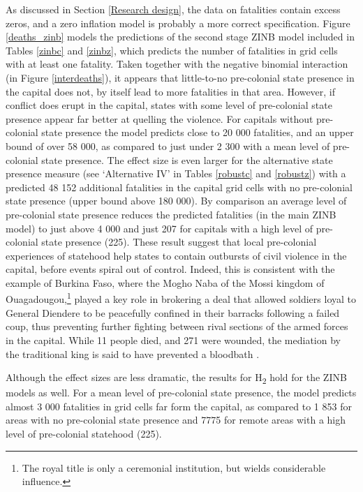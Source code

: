 \documentclass[12pt]{article}
\begin{document}
As discussed in Section \ref{Research design}, the data on fatalities contain
excess zeros, and a zero inflation model is probably a more correct
specification. Figure \ref{deaths_zinb} models the predictions of the second
stage ZINB model included in Tables \ref{zinbc} and \ref{zinbz}, which predicts
the number of fatalities in grid cells with at least one fatality. Taken
together with the negative binomial interaction (in Figure \ref{interdeaths}),
it appears that little-to-no pre-colonial state presence in the capital does
not, by itself lead to more fatalities in that area. However, if conflict does
erupt in the capital, states with some level of pre-colonial state presence
appear far better at quelling the violence. For capitals without pre-colonial
state presence the model predicts close to 20 000 fatalities, and an upper bound
of over 58 000, as compared to just under 2 300 with a mean level of
pre-colonial state presence. The effect size is even larger for the alternative
state presence measure (see `Alternative IV' in Tables \ref{robustc} and
\ref{robustz}) with a predicted 48 152 additional fatalities in the capital
grid cells with no pre-colonial state presence (upper bound above 180 000). By
comparison an average level of pre-colonial state presence reduces the predicted
fatalities (in the main ZINB model) to just above 4 000 and just 207 for
capitals with a high level of pre-colonial state presence (225). These result
suggest that local pre-colonial experiences of statehood help states to contain
outbursts of civil violence in the capital, before events spiral out of control.
Indeed, this is consistent with the example of Burkina Faso, where the Mogho
Naba of the Mossi kingdom of Ouagadougou,\footnote{The royal title is only a
ceremonial institution, but wields considerable influence.} played a key role
in brokering a deal that allowed soldiers loyal to General Diendere to be
peacefully confined in their barracks following a failed coup, thus preventing
further fighting between rival sections of the armed forces in the capital.
While 11 people died, and 271 were wounded, the mediation by the traditional
king is said to have prevented a bloodbath \citep{Reuters2015, BBC2015}.

Although the effect sizes are less dramatic, the results for H\textsubscript{2}
hold for the ZINB models as well. For a mean level of pre-colonial state
presence, the model predicts almost 3 000 fatalities in grid cells far form the
capital, as compared to 1 853 for areas with no pre-colonial state presence and
7775 for remote areas with a high level of pre-colonial statehood (225).
\end{document}
